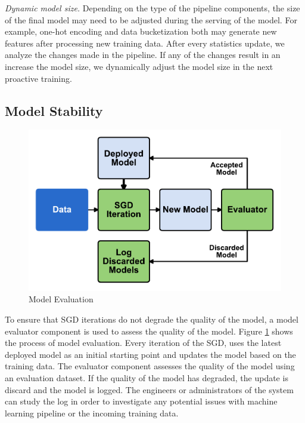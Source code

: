 \textit{Dynamic model size.}
Depending on the type of the pipeline components, the size of the final model may need to be adjusted during the serving of the model.
For example, one-hot encoding and data bucketization both may generate new features after processing new training data.
After every statistics update, we analyze the changes made in the pipeline.
If any of the changes result in an increase the model size, we dynamically adjust the model size in the next proactive training. 

\subsection{Model Stability}
\begin{figure}[t]
\centering
\includegraphics[width=\columnwidth]{../images/model-evaluation.pdf}
\caption{Model Evaluation}
\label{fig:model-evaluation}
\end{figure}

To ensure that SGD iterations do not degrade the quality of the model, a model evaluator component is used to assess the quality of the model.
Figure \ref{fig:model-evaluation} shows the process of model evaluation.
Every iteration of the SGD, uses the latest deployed model as an initial starting point and updates the model based on the training data.
The evaluator component assesses the quality of the model using an evaluation dataset.
If the quality of the model has degraded, the update is discard and the model is logged.
The engineers or administrators of the system can study the log in order to investigate any potential issues with machine learning pipeline or the incoming training data.

